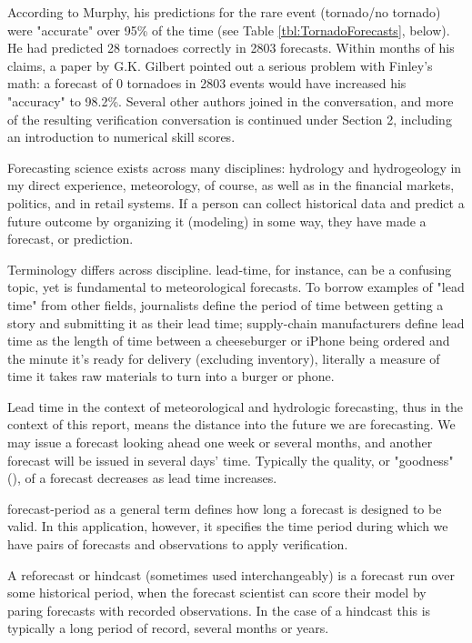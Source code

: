 \documentclass[logos,parttoc,morelanguage=french,morelanguage=german]{orsay-memoire}
\begin{document}
According to Murphy, his predictions for the rare event (tornado/no tornado) were "accurate" over 95\% of the time (see Table \ref{tbl:TornadoForecasts}, below). He had predicted 28 tornadoes correctly in 2803 forecasts. Within months of his claims, a paper by G.K. Gilbert pointed out a serious problem with Finley's math: a forecast of 0 tornadoes in 2803 events would have increased his "accuracy" to 98.2\%. Several other authors joined in the conversation, and more of the resulting verification conversation is continued under Section 2, including an introduction to numerical skill scores.

Forecasting science exists across many disciplines: hydrology and hydrogeology in my direct experience, meteorology, of course, as well as in the financial markets, politics, and in retail systems. If a person can collect historical data and predict a future outcome by organizing it (modeling) in some way, they have made a forecast, or prediction.

Terminology differs across discipline. \gls{lead-time}, for instance, can be a confusing topic, yet is fundamental to meteorological forecasts. To borrow examples of "lead time" from other fields, journalists define the period of time between getting a story and submitting it as their lead time; supply-chain manufacturers define lead time as the length of time between a cheeseburger or iPhone being ordered and the minute it's ready for delivery (excluding inventory), literally a measure of time it takes raw materials to turn into a burger or phone.

Lead time in the context of meteorological and hydrologic forecasting, thus in the context of this report, means the distance into the future we are forecasting. We may issue a forecast looking ahead one week or several months, and another forecast will be issued in several days' time. Typically the quality, or "goodness" (\autocite{murphy1993good}), of a forecast decreases as lead time increases.

\gls{forecast-period} as a general term defines how long a forecast is designed to be valid. In this application, however, it specifies the time period during which we have pairs of forecasts and observations to apply verification.

A reforecast or \gls{hindcast} (sometimes used interchangeably) is a forecast run over some historical period, when the forecast scientist can score their model by paring forecasts with recorded observations. In the case of a hindcast this is typically a long period of record, several months or years.
\end{document}
